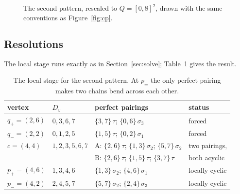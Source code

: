 \documentclass[11pt]{article}
\theoremstyle{definition}
\theoremstyle{remark}
\begin{document}
\begin{figure}[t]
\centering
{}
\caption{The second pattern, rescaled to $Q=[0,8]^2$, drawn with the same conventions as Figure~\ref{fig:cp}.}
\label{fig:deer}
\end{figure}

\subsection{Resolutions}

The local stage runs exactly as in Section~\ref{sec:solve}; Table~\ref{tab:deer} gives the result.

\begin{table}[h]
\centering\small
\begin{tabular}{llll}
\toprule
vertex & $D_v$ & perfect pairings & status\\
\midrule
$q_+=(2,6)$ & $0,3,6,7$ & $\{3,7\}\,\tau$; $\{0,6\}\,\sigma_3$ & forced\\
$q_-=(2,2)$ & $0,1,2,5$ & $\{1,5\}\,\tau$; $\{0,2\}\,\sigma_1$ & forced\\
$c=(4,4)$ & $1,2,3,5,6,7$ & A: $\{2,6\}\,\tau$; $\{1,3\}\,\sigma_2$; $\{5,7\}\,\sigma_2$ & two pairings,\\
 & & B: $\{2,6\}\,\tau$; $\{1,5\}\,\tau$; $\{3,7\}\,\tau$ & both acyclic\\
$p_+=(4,6)$ & $1,3,4,6$ & $\{1,3\}\,\sigma_2$; $\{4,6\}\,\sigma_1$ & locally cyclic\\
$p_-=(4,2)$ & $2,4,5,7$ & $\{5,7\}\,\sigma_2$; $\{2,4\}\,\sigma_3$ & locally cyclic\\
\bottomrule
\end{tabular}
\caption{The local stage for the second pattern. At $p_\pm$ the only perfect pairing makes two chains bend across each other.}
\label{tab:deer}
\end{table}
\end{document}

